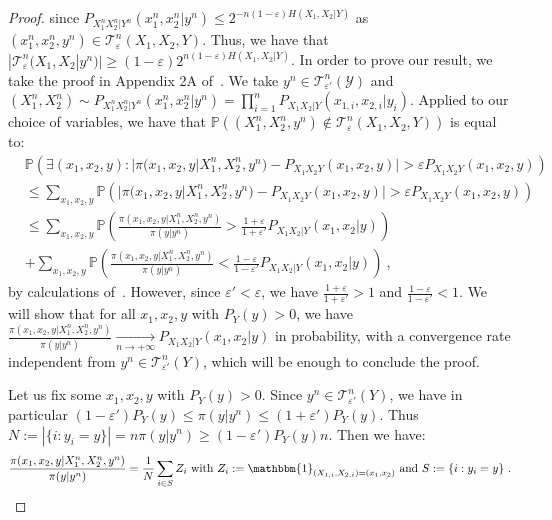 \begin{proof}
        since $P_{X_1^nX_2^n|Y^n}(x_1^n,x_2^n|y^n) \leq 2^{-n(1-\varepsilon)H(X_1,X_2|Y)}$ as $(x_1^n,x_2^n,y^n) \in \mathcal{T}^n_{\varepsilon}(X_1,X_2,Y)$. Thus, we have that $|\mathcal{T}^n_{\varepsilon}(X_1,X_2|y^n)| \geq (1-\varepsilon)2^{n(1-\varepsilon)H(X_1,X_2|Y)}$. In order to prove our result, we take the proof in Appendix 2A of~\cite{GK11}. We take $y^n \in \mathcal{T}^n_{\varepsilon'}(\mathcal{Y})$ and $(X_1^n,X_2^n) \sim P_{X_1^nX_2^n|Y^n}(x_1^n,x_2^n|y^n) = \prod_{i=1}^nP_{X_1X_2|Y}(x_{1,i},x_{2,i}|y_i)$. Applied to our choice of variables, we have that $\mathbb{P}\left((X_1^n,X_2^n,y^n) \notin \mathcal{T}^n_{\varepsilon}(X_1,X_2,Y) \right)$ is equal to:
        \begin{equation}
          \begin{aligned}
            &\mathbb{P}\left(\exists (x_1,x_2,y) : |\pi(x_1,x_2,y|X_1^n,X_2^n,y^n) - P_{X_1X_2Y}(x_1,x_2,y)| > \varepsilon P_{X_1X_2Y}(x_1,x_2,y) \right) \\
            &\leq \sum_{x_1,x_2,y} \mathbb{P}\left(|\pi(x_1,x_2,y|X_1^n,X_2^n,y^n) - P_{X_1X_2Y}(x_1,x_2,y)| > \varepsilon P_{X_1X_2Y}(x_1,x_2,y) \right) \\
            &\leq \sum_{x_1,x_2,y} \mathbb{P}\left(\frac{\pi(x_1,x_2,y|X_1^n,X_2^n,y^n)}{\pi(y|y^n)} > \frac{1+\varepsilon}{1+\varepsilon'}P_{X_1X_2|Y}(x_1,x_2|y) \right)\\
            &+ \sum_{x_1,x_2,y} \mathbb{P}\left(\frac{\pi(x_1,x_2,y|X_1^n,X_2^n,y^n)}{\pi(y|y^n)} < \frac{1-\varepsilon}{1-\varepsilon'}P_{X_1X_2|Y}(x_1,x_2|y) \right) \ ,
          \end{aligned}
        \end{equation}
        by calculations of~\cite{GK11}. However, since $\varepsilon' < \varepsilon$, we have $\frac{1+\varepsilon}{1+\varepsilon'} > 1$ and $\frac{1-\varepsilon}{1-\varepsilon'} < 1$. We will show that for all $x_1,x_2,y$ with $P_Y(y) > 0$, we have $\frac{\pi(x_1,x_2,y|X_1^n,X_2^n,y^n)}{\pi(y|y^n)} \underset{n \rightarrow +\infty}{\rightarrow} P_{X_1X_2|Y}(x_1,x_2|y)$ in probability, with a convergence rate independent from $y^n \in \mathcal{T}^n_{\varepsilon'}(Y)$, which will be enough to conclude the proof.

        Let us fix some $x_1,x_2,y$ with $P_Y(y) > 0$. Since $y^n \in \mathcal{T}^n_{\varepsilon'}(Y)$, we have in particular $(1-\varepsilon')P_Y(y) \leq \pi(y|y^n) \leq (1+\varepsilon')P_Y(y)$. Thus $N := |\{i:y_i=y\}| = n\pi(y|y^n) \geq (1-\varepsilon')P_Y(y)n$. Then we have:
        \[ \frac{\pi(x_1,x_2,y|X_1^n,X_2^n,y^n)}{\pi(y|y^n)} = \frac{1}{N}\sum_{i \in S}Z_i \text{ with }Z_i := \mathbbm{1}_{(X_{1,i},X_{2,i})=(x_1,x_2)} \text{ and } S := \{i:y_i=y\}\ . \]


\end{proof}
